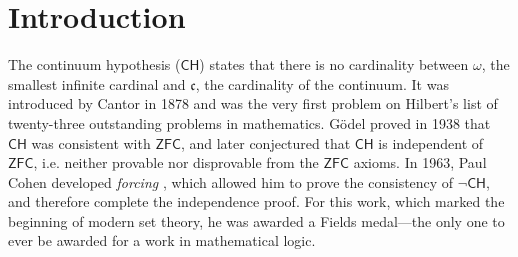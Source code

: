 \documentclass[sigplan,10pt,review, anonymous]{acmart}
\theoremstyle{definition}
\begin{document}




\maketitle


\section{Introduction}
\label{section:intro}
The continuum hypothesis ($\mathsf{CH}$) states that there is no cardinality between $\omega$, the smallest infinite cardinal and $\mathfrak{c}$, the cardinality of the continuum.
It was introduced by Cantor \cite{cantor1878beitrag} in 1878 and was the very first problem on Hilbert's list of twenty-three outstanding problems in mathematics.
G\"odel \cite{godel1938consistency} proved in 1938 that $\mathsf{CH}$ was consistent with $\mathsf{ZFC}$, and later conjectured that $\mathsf{CH}$ is independent of $\mathsf{ZFC}$, i.e. neither provable nor disprovable from the $\mathsf{ZFC}$ axioms.
In 1963, Paul Cohen developed \emph{forcing} \cite{cohen-the-independence-of-the-continuum-hypothesis-1,cohen1964independence2}, which allowed him to prove the consistency of $\neg \mathsf{CH}$, and therefore complete the independence proof.
For this work, which marked the beginning of modern set theory, he was awarded a Fields medal---the only one to ever be awarded for a work in mathematical logic.
\end{document}
